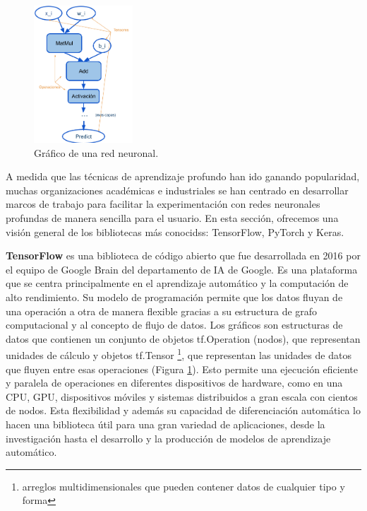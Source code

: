 \begin{figure}
  \begin{center}
    \includegraphics[width=0.33\textwidth]{img/graficoTF.png}
  \end{center}
    \caption{Gráfico de una red neuronal.}
  \label{fig:graficoTF}
\end{figure}
\vspace{-\baselineskip}

A medida que las técnicas de aprendizaje profundo han ido ganando popularidad, muchas organizaciones académicas e industriales se han centrado en desarrollar marcos de trabajo para facilitar la experimentación con redes neuronales profundas de manera sencilla para el usuario. En esta sección, ofrecemos una visión general de los bibliotecas más conocidss: TensorFlow, PyTorch y Keras.

 
\textbf{TensorFlow} \citep{tensorflow} es una biblioteca de código abierto que fue desarrollada en 2016 por el equipo de Google Brain del departamento de IA de Google. Es una plataforma que se centra principalmente en el aprendizaje automático y la computación de alto rendimiento. Su modelo de programación permite que los datos fluyan de una operación a otra de manera flexible gracias a su estructura de grafo computacional y al concepto de flujo de datos. Los gráficos son estructuras de datos que contienen un conjunto de objetos tf.Operation (nodos), que representan unidades de cálculo y objetos tf.Tensor \footnote{arreglos multidimensionales que pueden contener datos de cualquier tipo y forma}, que representan las unidades de datos que fluyen entre esas operaciones (Figura \ref{fig:graficoTF}). Esto permite una ejecución eficiente y paralela de operaciones en diferentes dispositivos de hardware, como en una CPU, GPU, dispositivos móviles y sistemas distribuidos a gran escala con cientos de nodos. Esta flexibilidad y además su capacidad de diferenciación automática lo hacen una biblioteca útil para una gran variedad de aplicaciones, desde la investigación hasta el desarrollo y la producción de modelos de aprendizaje automático.





